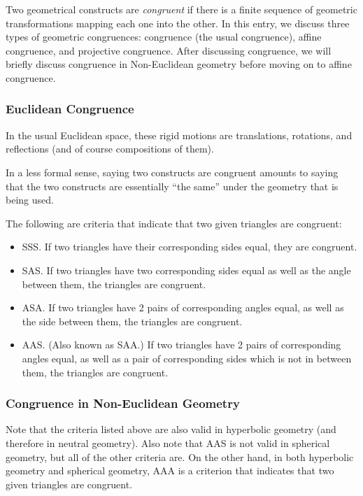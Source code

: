 \documentclass{article}
\begin{document}

Two geometrical constructs are \emph{congruent} if there is a finite sequence of geometric transformations mapping each one into the other.  In this entry, we discuss three types of geometric congruences:  congruence (the usual congruence), affine congruence, and projective congruence.  After discussing  congruence, we will briefly discuss congruence in Non-Euclidean geometry before moving on to affine congruence.

\subsubsection*{Euclidean Congruence}
In the usual Euclidean space, these rigid motions are translations, rotations, and reflections (and of course compositions of them).

In a less formal sense, saying two constructs are congruent amounts to saying that the two constructs are essentially ``the same'' under the geometry that is being used.

The following are criteria that indicate that two given triangles are congruent:
\begin{itemize}
\item SSS. If two triangles have their corresponding sides equal, they are congruent.
\item SAS. If two triangles have two corresponding sides equal as well as the angle between them, the triangles are congruent.
\item ASA. If two triangles have 2 pairs of corresponding angles equal, as well as the side between them, the triangles are congruent.
\item AAS. (Also known as SAA.) If two triangles have 2 pairs of corresponding angles equal, as well as a pair of corresponding sides which is not in between them, the triangles are congruent.
\end{itemize}

\subsubsection*{Congruence in Non-Euclidean Geometry}

Note that the criteria listed above are also valid in hyperbolic geometry (and therefore in neutral geometry).  Also note that AAS is not valid in spherical geometry, but all of the other criteria are.  On the other hand, in both hyperbolic geometry and spherical geometry, AAA is a criterion that indicates that two given triangles are congruent.
\end{document}
